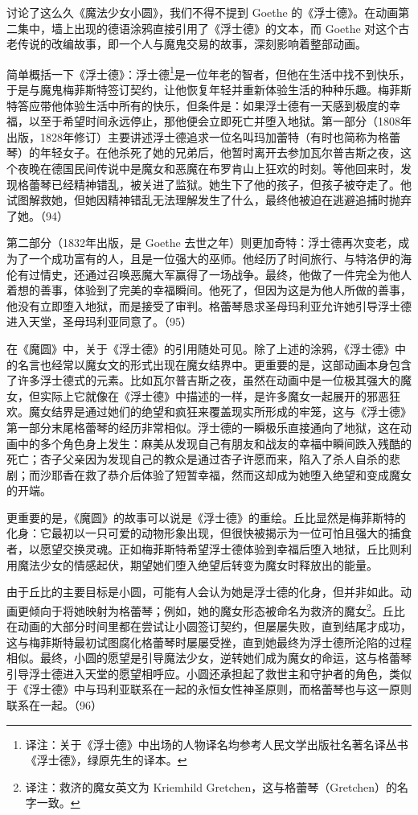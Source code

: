 
讨论了这么久《魔法少女小圆》，我们不得不提到 Goethe 的《浮士德》。在动画第二集中，墙上出现的德语涂鸦直接引用了《浮士德》的文本，而 Goethe 对这个古老传说的改编故事，即一个人与魔鬼交易的故事，深刻影响着整部动画。

简单概括一下《浮士德》：浮士德\footnote{译注：关于《浮士德》中出场的人物译名均参考人民文学出版社名著名译丛书《浮士德》，绿原先生的译本。}是一位年老的智者，但他在生活中找不到快乐，于是与魔鬼梅菲斯特签订契约，让他恢复年轻并重新体验生活的种种乐趣。梅菲斯特答应带他体验生活中所有的快乐，但条件是：如果浮士德有一天感到极度的幸福，以至于希望时间永远停止，那他便会立即死亡并堕入地狱。第一部分（1808年出版，1828年修订）主要讲述浮士德追求一位名叫玛加蕾特（有时也简称为格蕾琴）的年轻女子。在他杀死了她的兄弟后，他暂时离开去参加瓦尔普吉斯之夜，这个夜晚在德国民间传说中是魔女和恶魔在布罗肯山上狂欢的时刻。等他回来时，发现格蕾琴已经精神错乱，被关进了监狱。她生下了他的孩子，但孩子被夺走了。他试图解救她，但她因精神错乱无法理解发生了什么，最终他被迫在逃避追捕时抛弃了她。（94）

第二部分（1832年出版，是 Goethe 去世之年）则更加奇特：浮士德再次变老，成为了一个成功富有的人，且是一位强大的巫师。他经历了时间旅行、与特洛伊的海伦有过情史，还通过召唤恶魔大军赢得了一场战争。最终，他做了一件完全为他人着想的善事，体验到了完美的幸福瞬间。他死了，但因为这是为他人所做的善事，他没有立即堕入地狱，而是接受了审判。格蕾琴恳求圣母玛利亚允许她引导浮士德进入天堂，圣母玛利亚同意了。（95）

在《魔圆》中，关于《浮士德》的引用随处可见。除了上述的涂鸦，《浮士德》中的名言也经常以魔女文的形式出现在魔女结界中。更重要的是，这部动画本身包含了许多浮士德式的元素。比如瓦尔普吉斯之夜，虽然在动画中是一位极其强大的魔女，但实际上它就像在《浮士德》中描述的一样，是许多魔女一起展开的邪恶狂欢。魔女结界是通过她们的绝望和疯狂来覆盖现实所形成的牢笼，这与《浮士德》第一部分末尾格蕾琴的经历非常相似。浮士德的一瞬极乐直接通向了地狱，这在动画中的多个角色身上发生：麻美从发现自己有朋友和战友的幸福中瞬间跌入残酷的死亡；杏子父亲因为发现自己的教众是通过杏子许愿而来，陷入了杀人自杀的悲剧；而沙耶香在救了恭介后体验了短暂幸福，然而这却成为她堕入绝望和变成魔女的开端。

更重要的是，《魔圆》的故事可以说是《浮士德》的重绘。丘比显然是梅菲斯特的化身：它最初以一只可爱的动物形象出现，但很快被揭示为一位可怕且强大的捕食者，以愿望交换灵魂。正如梅菲斯特希望浮士德体验到幸福后堕入地狱，丘比则利用魔法少女的情感起伏，期望她们堕入绝望后转变为魔女时释放出的能量。

由于丘比的主要目标是小圆，可能有人会认为她是浮士德的化身，但并非如此。动画更倾向于将她映射为格蕾琴；例如，她的魔女形态被命名为救济的魔女\footnote{译注：救济的魔女英文为 Kriemhild Gretchen，这与格蕾琴（Gretchen）的名字一致。}。丘比在动画的大部分时间里都在尝试让小圆签订契约，但屡屡失败，直到结尾才成功，这与梅菲斯特最初试图腐化格蕾琴时屡屡受挫，直到她最终为浮士德所沦陷的过程相似。最终，小圆的愿望是引导魔法少女，逆转她们成为魔女的命运，这与格蕾琴引导浮士德进入天堂的愿望相呼应。小圆还承担起了救世主和守护者的角色，类似于《浮士德》中与玛利亚联系在一起的永恒女性神圣原则，而格蕾琴也与这一原则联系在一起。（96）

